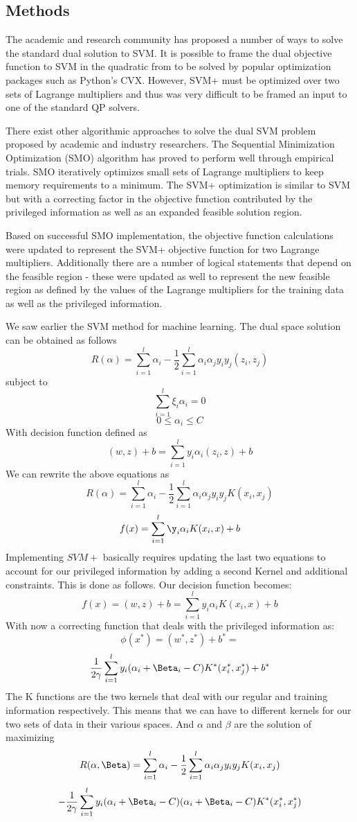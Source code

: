 \documentclass[twoside]{article}\usepackage[]{graphicx}\usepackage[]{color}
\begin{document}
\begin{multicols}{2}
\section{Methods}
The academic and research community has proposed a number of ways to solve
the standard dual solution to SVM\@. It is possible to frame the dual objective
function to SVM in the quadratic from to be solved by popular optimization packages
such as Python's CVX\@. However, SVM+ must be optimized over two sets of Lagrange
multipliers and thus was very difficult to be framed an input to one of
the standard QP solvers.

There exist other algorithmic approaches to solve the dual SVM problem proposed
by academic and industry researchers. The Sequential Minimization Optimization (SMO)
algorithm has proved to perform well through empirical trials. SMO iteratively optimizes
small sets of Lagrange multipliers to keep memory requirements to a minimum. The SVM+
optimization is similar to SVM but with a correcting factor in the objective
function contributed by the privileged information as well as an expanded feasible solution region. 

Based on successful SMO implementation, the objective function calculations
were updated to represent the SVM+ objective function for two Lagrange multipliers.
Additionally there are a number of logical statements that depend on the feasible region
- these were updated as well to represent the new feasible region as defined by
the values of the Lagrange multipliers for the training data as well as the privileged information. 

We saw earlier the SVM method for machine learning. The dual space solution can be
obtained as follows
\[
  R(\alpha) = \sum\limits_{i=1}^l\alpha_i - \frac{1}{2}\sum\limits_{i=1}^l \alpha_i \alpha_j y_i y_j(z_i,z_j)
\]
subject to
\[
  \sum\limits^l_{i=1}\xi_i\alpha_i = 0 
\]
\[
  0 \le \alpha_i \le C
\]
With decision function defined as
\[
  (w,z) + b = \sum\limits_{i=1}^l{y_i}\alpha_i(z_i,z) + b
\]
We can rewrite the above equations as
\[
  R(\alpha) = \sum\limits_{i=1}^l\alpha_i - \frac{1}{2}\sum\limits_{i=1}^l \alpha_i \alpha_j y_i y_jK(x_i,x_j)
\]
\[
  f(x) = \sum\limits_{i=1}^l\y_i\alpha_iK(x_i,x) + b
\]
Implementing $SVM+$ basically requires updating the last two equations to account
for our privileged information by adding a second Kernel and additional
constraints. This is done as follows.
Our decision function becomes:
\[
  f(x) = (w,z) + b = \sum\limits_{i=1}^l{y_i}\alpha_iK(x_i,x) + b
\]
With now a correcting function that deals with the privileged information as:
\[
  \phi(x^*) = (w^*,z^*) + b^* = \]
\[
\frac{1}{2\gamma}\sum\limits_{i=1}^l{y_i}(\alpha_i + \Beta_i - C)K^*(x_i^*,x_j^*) +b^*
\]
The K functions are the two kernels that deal with our regular and training
information respectively. This means that we can have to different kernels for our
two sets of data in their various spaces. And $\alpha$ and $\beta$ are the solution
of maximizing
\[
  R(\alpha,\Beta) = \sum\limits_{i=1}^l\alpha_i - \frac{1}{2}\sum\limits_{i=1}^l \alpha_i \alpha_j y_i y_jK(x_i,x_j)
\]
\[
-\frac{1}{2\gamma}\sum\limits_{i=1}^l{y_i}(\alpha_i + \Beta_i - C)(\alpha_i + \Beta_i - C)K^*(x_i^*,x_j^*)
\]


\end{multicols}
\end{document}
